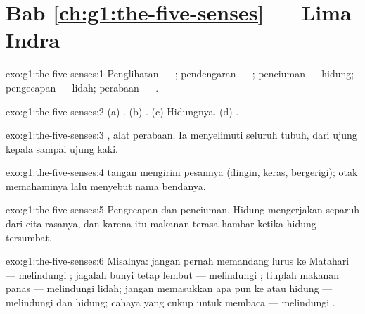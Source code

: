 \section*{Bab \ref{ch:g1:the-five-senses} --- Lima Indra}

\begin{solution}{exo:g1:the-five-senses:1}
Penglihatan --- ; pendengaran --- ; penciuman --- hidung;
pengecapan --- lidah; perabaan --- .
\end{solution}

\begin{solution}{exo:g1:the-five-senses:2}
(a) . (b) . (c) Hidungnya. (d) .
\end{solution}

\begin{solution}{exo:g1:the-five-senses:3}
, alat perabaan. Ia menyelimuti seluruh tubuh, dari ujung kepala
sampai ujung kaki.
\end{solution}

\begin{solution}{exo:g1:the-five-senses:4}
 tangan mengirim pesannya (dingin, keras, bergerigi); otak
memahaminya lalu menyebut nama bendanya.
\end{solution}

\begin{solution}{exo:g1:the-five-senses:5}
Pengecapan dan penciuman. Hidung mengerjakan separuh dari cita
rasanya, dan karena itu makanan terasa hambar ketika hidung tersumbat.
\end{solution}

\begin{solution}{exo:g1:the-five-senses:6}
Misalnya: jangan pernah memandang lurus ke Matahari --- melindungi
; jagalah bunyi tetap lembut --- melindungi ; tiuplah
makanan panas --- melindungi lidah; jangan memasukkan apa pun ke
 atau hidung --- melindungi  dan hidung; cahaya yang
cukup untuk membaca --- melindungi .
\end{solution}

